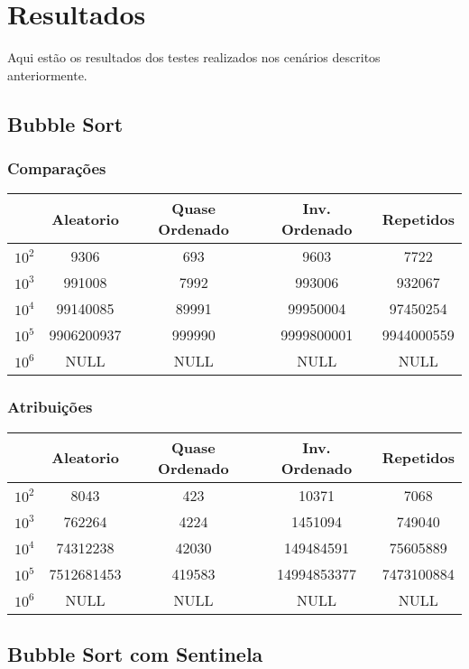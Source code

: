 \chapter{Resultados}
\label{chap:resultados}
Aqui estão os resultados dos testes realizados nos cenários descritos anteriormente.

\section{Bubble Sort}
\label{sec:bubble_sort}
\subsection{Comparações}
\begin{tabular}{|c|c|c|c|c|}
\hline
  & Aleatorio  & Quase Ordenado & Inv. Ordenado & Repetidos \\
\hline
$10^2$ & 9306       & 693            & 9603          & 7722       \\
\hline
$10^3$ & 991008     & 7992           & 993006        & 932067     \\
\hline
$10^4$ & 99140085   & 89991          & 99950004      & 97450254   \\
\hline
$10^5$ & 9906200937 & 999990         & 9999800001    & 9944000559 \\
\hline
$10^6$ & NULL       & NULL           & NULL          & NULL      \\
\hline
\end{tabular}
\subsection{Atribuições}
\begin{tabular}{|c|c|c|c|c|}
\hline
  & Aleatorio  & Quase Ordenado & Inv. Ordenado & Repetidos  \\
  \hline
$10^2$ & 8043       & 423            & 10371         & 7068       \\
\hline
$10^3$ & 762264     & 4224           & 1451094       & 749040     \\
\hline
$10^4$ & 74312238   & 42030          & 149484591     & 75605889   \\
\hline
$10^5$ & 7512681453 & 419583         & 14994853377   & 7473100884 \\
\hline
$10^6$ & NULL       & NULL           & NULL          & NULL      \\
\hline
\end{tabular}

\section{Bubble Sort com Sentinela}
\label{sec:bubble_sent}
